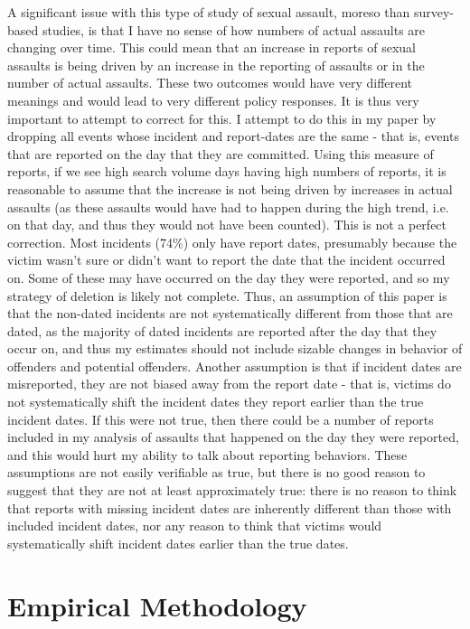 \documentclass[AER,draftmode]{AEA}
\begin{document}
A significant issue with this type of study of sexual assault, moreso than survey-based studies, is that I have no sense of how numbers of actual assaults are changing over time. This could mean that an increase in reports of sexual assaults is being driven by an increase in the reporting of assaults or in the number of actual assaults. These two outcomes would have very different meanings and would lead to very different policy responses. It is thus very important to attempt to correct for this. I attempt to do this in my paper by dropping all events whose incident and report-dates are the same - that is, events that are reported on the day that they are committed. Using this measure of reports, if we see high search volume days having high numbers of reports, it is reasonable to assume that the increase is not being driven by increases in actual assaults (as these assaults would have had to happen during the high trend, i.e. on that day, and thus they would not have been counted). This is not a perfect correction. Most incidents (74\%) only have report dates, presumably because the victim wasn't sure or didn't want to report the date that the incident occurred on. Some of these may have occurred on the day they were reported, and so my strategy of deletion is likely not complete. Thus, an assumption of this paper is that the non-dated incidents are not systematically different from those that are dated, as the majority of dated incidents are reported after the day that they occur on, and thus my estimates should not include sizable changes in behavior of offenders and potential offenders. Another assumption is that if incident dates are misreported, they are not biased away from the report date - that is, victims do not systematically shift the incident dates they report earlier than the true incident dates. If this were not true, then there could be a number of reports included in my analysis of assaults that happened on the day they were reported, and this would hurt my ability to talk about reporting behaviors. These assumptions are not easily verifiable as true, but there is no good reason to suggest that they are not at least approximately true: there is no reason to think that reports with missing incident dates are inherently different than those with included incident dates, nor any reason to think that victims would systematically shift incident dates earlier than the true dates.

\section{Empirical Methodology}
\end{document}
